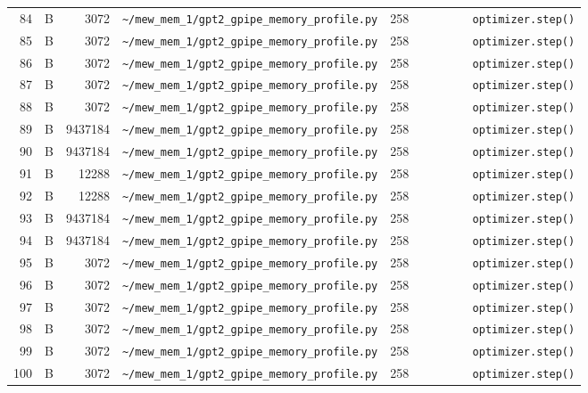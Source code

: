 \documentclass{article}
\begin{document}
\begin{longtable}{r l r p{6.5cm} r p{7.0cm}}
84 & B & 3072 & \lstinline|~/mew_mem_1/gpt2_gpipe_memory_profile.py| & 258 & \lstinline|        optimizer.step()| \\
85 & B & 3072 & \lstinline|~/mew_mem_1/gpt2_gpipe_memory_profile.py| & 258 & \lstinline|        optimizer.step()| \\
86 & B & 3072 & \lstinline|~/mew_mem_1/gpt2_gpipe_memory_profile.py| & 258 & \lstinline|        optimizer.step()| \\
87 & B & 3072 & \lstinline|~/mew_mem_1/gpt2_gpipe_memory_profile.py| & 258 & \lstinline|        optimizer.step()| \\
88 & B & 3072 & \lstinline|~/mew_mem_1/gpt2_gpipe_memory_profile.py| & 258 & \lstinline|        optimizer.step()| \\
89 & B & 9437184 & \lstinline|~/mew_mem_1/gpt2_gpipe_memory_profile.py| & 258 & \lstinline|        optimizer.step()| \\
90 & B & 9437184 & \lstinline|~/mew_mem_1/gpt2_gpipe_memory_profile.py| & 258 & \lstinline|        optimizer.step()| \\
91 & B & 12288 & \lstinline|~/mew_mem_1/gpt2_gpipe_memory_profile.py| & 258 & \lstinline|        optimizer.step()| \\
92 & B & 12288 & \lstinline|~/mew_mem_1/gpt2_gpipe_memory_profile.py| & 258 & \lstinline|        optimizer.step()| \\
93 & B & 9437184 & \lstinline|~/mew_mem_1/gpt2_gpipe_memory_profile.py| & 258 & \lstinline|        optimizer.step()| \\
94 & B & 9437184 & \lstinline|~/mew_mem_1/gpt2_gpipe_memory_profile.py| & 258 & \lstinline|        optimizer.step()| \\
95 & B & 3072 & \lstinline|~/mew_mem_1/gpt2_gpipe_memory_profile.py| & 258 & \lstinline|        optimizer.step()| \\
96 & B & 3072 & \lstinline|~/mew_mem_1/gpt2_gpipe_memory_profile.py| & 258 & \lstinline|        optimizer.step()| \\
97 & B & 3072 & \lstinline|~/mew_mem_1/gpt2_gpipe_memory_profile.py| & 258 & \lstinline|        optimizer.step()| \\
98 & B & 3072 & \lstinline|~/mew_mem_1/gpt2_gpipe_memory_profile.py| & 258 & \lstinline|        optimizer.step()| \\
99 & B & 3072 & \lstinline|~/mew_mem_1/gpt2_gpipe_memory_profile.py| & 258 & \lstinline|        optimizer.step()| \\
100 & B & 3072 & \lstinline|~/mew_mem_1/gpt2_gpipe_memory_profile.py| & 258 & \lstinline|        optimizer.step()| \\

\end{longtable}
\end{document}
